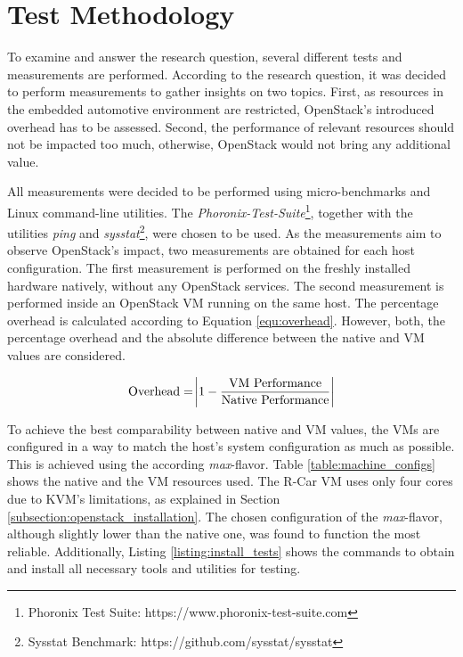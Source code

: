 \chapter{Test Methodology}
\label{chapter:methodology}

    To examine and answer the research question, several different tests and measurements are performed.
    According to the research question, it was decided to perform measurements to gather insights on two topics.
    First, as resources in the embedded automotive environment are restricted, OpenStack's introduced overhead has to be assessed.
    Second, the performance of relevant resources should not be impacted too much, otherwise, OpenStack would not bring any additional value.
    
    \noindent All measurements were decided to be performed using micro-benchmarks and Linux command-line utilities.
    The \textsl{Phoronix-Test-Suite}\footnote{Phoronix Test Suite: https://www.phoronix-test-suite.com}, together with the utilities \textsl{ping} and \textsl{sysstat}\footnote{Sysstat Benchmark: https://github.com/sysstat/sysstat}, were chosen to be used.
    As the measurements aim to observe OpenStack’s impact, two measurements are obtained for each host configuration. 
    The first measurement is performed on the freshly installed hardware natively, without any OpenStack services.
    The second measurement is performed inside an OpenStack \ac{VM} running on the same host.
    The percentage overhead is calculated according to Equation \ref{equ:overhead}.
    However, both, the percentage overhead and the absolute difference between the native and VM values are considered.
    
    \begin{equation}
    \label{equ:overhead}
        \text{Overhead} = \abs{1 - \frac{\text{VM Performance}}{\text{Native Performance}}}
    \end{equation}
    
    \noindent To achieve the best comparability between native and VM values, the \acp{VM} are configured in a way to match the host's system configuration as much as possible.
    This is achieved using the according \textsl{max}-flavor.
    Table \ref{table:machine_configs} shows the native and the \ac{VM} resources used.
    The R-Car \ac{VM} uses only four cores due to \ac{KVM}'s limitations, as explained in Section \ref{subsection:openstack_installation}.
    The chosen configuration of the \textsl{max}-flavor, although slightly lower than the native one, was found to function the most reliable.
    Additionally, Listing \ref{listing:install_tests} shows the commands to obtain and install all necessary tools and utilities for testing.
    
